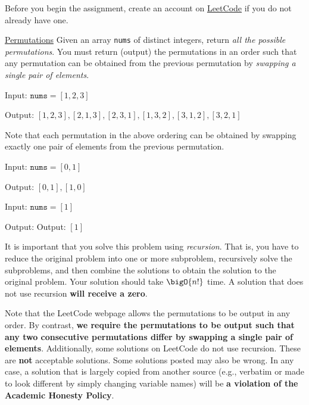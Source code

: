 \documentclass[draft]{article}
\begin{document}
\begin{titlepage}
    Before you begin the assignment, create an account on \href{https://leetcode.com/}{LeetCode} if you do not already have one.

    \begin{problem}{\href{https://leetcode.com/problems/permutations/}{Permutations}}{}
    Given an array \texttt{nums} of distinct integers, return \emph{all the possible permutations}. You must return (output) the permutations in an order such that any permutation can be obtained from the previous permutation  by \emph{swapping a single pair of elements}.
    \end{problem}

    \begin{example}{}{}
        Input: $\texttt{nums} = [1,2,3]$

        Output: \noindent $[1, 2, 3], [2, 1, 3], [2, 3, 1], [1, 3, 2], [3, 1, 2], [3, 2, 1]$

        Note that each permutation in the above ordering can be obtained by swapping exactly one pair of elements from the previous permutation.

    \end{example}

    \begin{example}{}{}
        Input: $\texttt{nums} = [0,1]$

        Output: \noindent $[0, 1], [1, 0]$
    \end{example}

    \begin{example}{}{}
        Input: $\texttt{nums} = [1]$

        Output: \noindent Output: $[1]$
    \end{example}

    It is important that you solve this problem using \emph{recursion}. That is, you have to reduce the original problem into one or more subproblem, recursively solve the subproblems, and then combine the solutions to obtain the solution to the original problem. Your solution should take $\bigO{n!}$ time. A solution that does not use recursion \textbf{will receive a zero}.

    Note that the LeetCode webpage allows the permutations to be output in any order. By contrast, \textbf{we require the permutations to be output such that any two consecutive permutations differ by swapping a single pair of elements}. Additionally, some solutions on LeetCode do not use recursion. These are \textbf{not} acceptable solutions. Some solutions posted may also be wrong. In any case,
    a solution that is largely copied from another source (e.g., verbatim or made to look different by simply changing variable names) will be \textbf{a violation of the Academic Honesty Policy}.


\end{titlepage}
\end{document}
